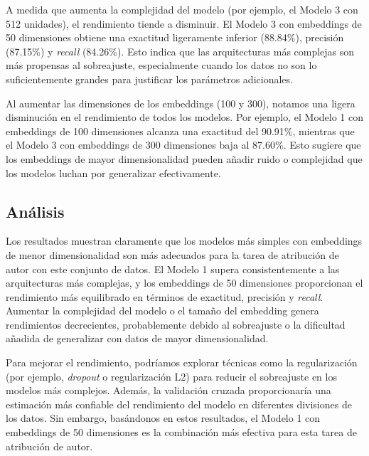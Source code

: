 \documentclass[11pt,english]{article}
\theoremstyle{plain}
\begin{document}
A medida que aumenta la complejidad del modelo (por ejemplo, el Modelo 3 con 512 unidades), el rendimiento tiende a disminuir. El Modelo 3 con embeddings de 50 dimensiones obtiene una exactitud ligeramente inferior (88.84\%), precisión (87.15\%) y \textit{recall} (84.26\%). Esto indica que las arquitecturas más complejas son más propensas al sobreajuste, especialmente cuando los datos no son lo suficientemente grandes para justificar los parámetros adicionales.

Al aumentar las dimensiones de los embeddings (100 y 300), notamos una ligera disminución en el rendimiento de todos los modelos. Por ejemplo, el Modelo 1 con embeddings de 100 dimensiones alcanza una exactitud del 90.91\%, mientras que el Modelo 3 con embeddings de 300 dimensiones baja al 87.60\%. Esto sugiere que los embeddings de mayor dimensionalidad pueden añadir ruido o complejidad que los modelos luchan por generalizar efectivamente.

\subsection*{Análisis}

Los resultados muestran claramente que los modelos más simples con embeddings de menor dimensionalidad son más adecuados para la tarea de atribución de autor con este conjunto de datos. El Modelo 1 supera consistentemente a las arquitecturas más complejas, y los embeddings de 50 dimensiones proporcionan el rendimiento más equilibrado en términos de exactitud, precisión y \textit{recall}. Aumentar la complejidad del modelo o el tamaño del embedding genera rendimientos decrecientes, probablemente debido al sobreajuste o la dificultad añadida de generalizar con datos de mayor dimensionalidad.

Para mejorar el rendimiento, podríamos explorar técnicas como la regularización (por ejemplo, \textit{dropout} o regularización L2) para reducir el sobreajuste en los modelos más complejos. Además, la validación cruzada proporcionaría una estimación más confiable del rendimiento del modelo en diferentes divisiones de los datos. Sin embargo, basándonos en estos resultados, el Modelo 1 con embeddings de 50 dimensiones es la combinación más efectiva para esta tarea de atribución de autor.
\end{document}

